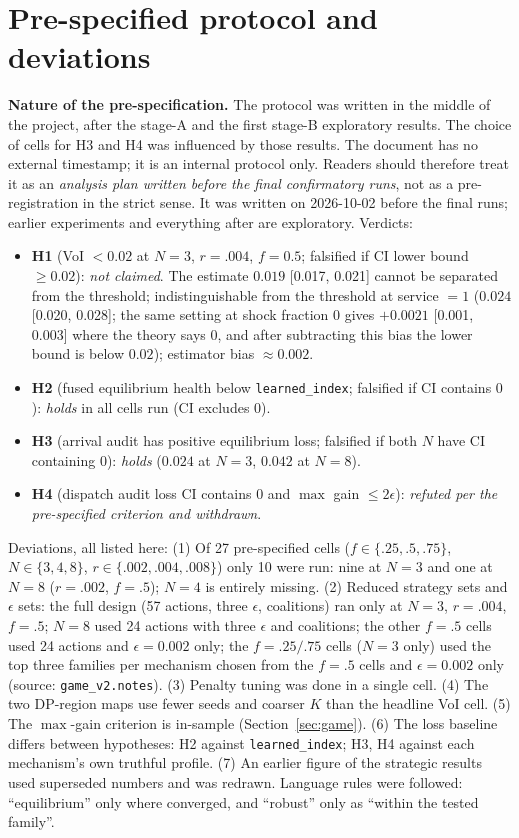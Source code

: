 \documentclass[10pt]{article}
\begin{document}
\section{Pre-specified protocol and deviations}\label{sec:prereg}
\textbf{Nature of the pre-specification.} The protocol was written in the middle of the project, after the stage-A and the first stage-B exploratory results. The choice of cells for H3 and H4 was influenced by those results. The document has no external timestamp; it is an internal protocol only. Readers should therefore treat it as an \emph{analysis plan written before the final confirmatory runs}, not as a pre-registration in the strict sense. It was written on 2026-10-02 before the final runs; earlier experiments and everything after are exploratory. Verdicts:
\begin{itemize}
\item \textbf{H1} (VoI $<0.02$ at $N{=}3$, $r{=}.004$, $f{=}0.5$; falsified if CI lower bound $\ge0.02$): \emph{not claimed}. The estimate $0.019$ [0.017, 0.021] cannot be separated from the threshold; indistinguishable from the threshold at service $=1$ ($0.024$ [0.020, 0.028]; the same setting at shock fraction $0$ gives $+0.0021$ [0.001, 0.003] where the theory says $0$, and after subtracting this bias the lower bound is below $0.02$); estimator bias $\approx0.002$.
\item \textbf{H2} (fused equilibrium health below \texttt{learned\_index}; falsified if CI contains $0$): \emph{holds} in all cells run (CI excludes $0$).
\item \textbf{H3} (arrival audit has positive equilibrium loss; falsified if both $N$ have CI containing $0$): \emph{holds} ($0.024$ at $N{=}3$, $0.042$ at $N{=}8$).
\item \textbf{H4} (dispatch audit loss CI contains $0$ and $\max$ gain $\le2\epsilon$): \emph{refuted per the pre-specified criterion and withdrawn}.
\end{itemize}
Deviations, all listed here: (1) Of 27 pre-specified cells ($f\in\{.25,.5,.75\}$, $N\in\{3,4,8\}$, $r\in\{.002,.004,.008\}$) only 10 were run: nine at $N{=}3$ and one at $N{=}8$ ($r{=}.002$, $f{=}.5$); $N{=}4$ is entirely missing. (2) Reduced strategy sets and $\epsilon$ sets: the full design (57 actions, three $\epsilon$, coalitions) ran only at $N{=}3$, $r{=}.004$, $f{=}.5$; $N{=}8$ used 24 actions with three $\epsilon$ and coalitions; the other $f{=}.5$ cells used 24 actions and $\epsilon=0.002$ only; the $f{=}.25/.75$ cells ($N{=}3$ only) used the top three families per mechanism chosen from the $f{=}.5$ cells and $\epsilon=0.002$ only (source: \texttt{game\_v2.notes}). (3) Penalty tuning was done in a single cell. (4) The two DP-region maps use fewer seeds and coarser $K$ than the headline VoI cell. (5) The $\max$-gain criterion is in-sample (Section~\ref{sec:game}). (6) The loss baseline differs between hypotheses: H2 against \texttt{learned\_index}; H3, H4 against each mechanism's own truthful profile. (7) An earlier figure of the strategic results used superseded numbers and was redrawn. Language rules were followed: ``equilibrium'' only where converged, and ``robust'' only as ``within the tested family''.
\end{document}
